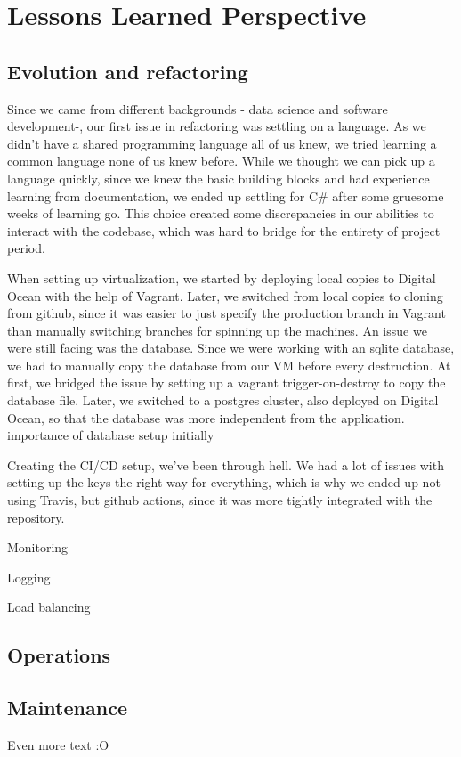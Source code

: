 \documentclass[report/main.tex]{subfiles}
\begin{document}
    \section{Lessons Learned Perspective}
    \label{Sec:lessons_learned_persective}
    \subsection{Evolution and refactoring}
    Since we came from different backgrounds - data science and software development-, our first issue in refactoring was settling on a language. As we didn't have a shared programming language all of us knew, we tried learning a common language none of us knew before. While we thought we can pick up a language quickly, since we knew the basic building blocks and had experience learning from documentation, we ended up settling for C# after some gruesome weeks of learning go. This choice created some discrepancies in our abilities to interact with the codebase, which was hard to bridge for the entirety of project period.
    
    When setting up virtualization, we started by deploying local copies to Digital Ocean with the help of Vagrant. Later, we switched from local copies to cloning from github, since it was easier to just specify the production branch in Vagrant than manually switching branches for spinning up the machines. An issue we were still facing was the database. Since we were working with an sqlite database, we had to manually copy the database from our VM before every destruction. At first, we bridged the issue by setting up a vagrant trigger-on-destroy to copy the database file. Later, we switched to a postgres cluster, also deployed on Digital Ocean, so that the database was more independent from the application.
    importance of database setup initially
    
    Creating the CI/CD setup, we've been through hell. We had a lot of issues with setting up the keys the right way for everything, which is why we ended up not using Travis, but github actions, since it was more tightly integrated with the repository.
    
    Monitoring
    
    Logging
    
    Load balancing
    \subsection{Operations}
    
    \subsection{Maintenance}
        Even more text :O
\end{document}
